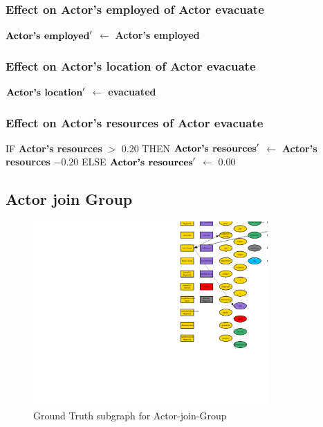 \documentclass{article}%
\begin{document}
%
\subsubsection{Effect on Actor's employed of Actor evacuate}%
\label{ssubsec:Effect on Actor's employed of Actor evacuate}%
\begin{flushleft}%
$\mbox{\textbf{Actor's employed}} '$%
$\leftarrow$%
\textbf{Actor's employed}%
\end{flushleft}

%
\subsubsection{Effect on Actor's location of Actor evacuate}%
\label{ssubsec:Effect on Actor's location of Actor evacuate}%
\begin{flushleft}%
$\mbox{\textbf{Actor's location}} '$%
$\leftarrow$%
\textbf{evacuated}%
\end{flushleft}

%
\subsubsection{Effect on Actor's resources of Actor evacuate}%
\label{ssubsec:Effect on Actor's resources of Actor evacuate}%
\begin{flushleft}%
IF %
\textbf{Actor's resources}%
$>$%
0.20%
\linebreak%
\hspace*{2em}%
THEN %
$\mbox{\textbf{Actor's resources}} '$%
$\leftarrow$%
\textbf{Actor's resources}%
${-}0.20$%
\linebreak%
\hspace*{2em}%
ELSE %
$\mbox{\textbf{Actor's resources}} '$%
$\leftarrow$%
0.00%
\end{flushleft}

%
\subsection{Actor join Group}%
\label{subsec:Actor join Group}%


\begin{figure}[ht]%
\centering%
\includegraphics[width=0.8\textwidth]{images/Actor-join-Group.png}%
\caption{Ground Truth subgraph for Actor{-}join{-}Group}%
\end{figure}
\end{document}

